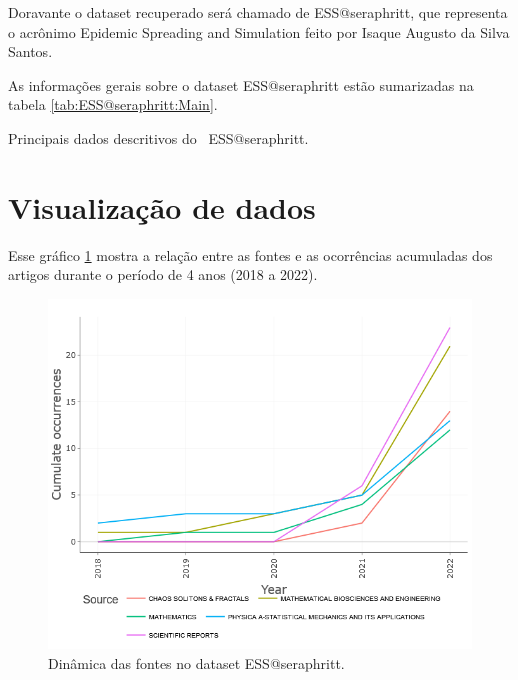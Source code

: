 Doravante o dataset recuperado será chamado de ESS@seraphritt, que representa o acrônimo Epidemic Spreading and Simulation feito por Isaque Augusto da Silva Santos.

As informações gerais sobre o dataset ESS@seraphritt estão sumarizadas na tabela \ref{tab:ESS@seraphritt:Main}.

\begin{table}[htp]
\centering
{}
    \caption{Principais dados descritivos do \dataset\ ESS@seraphritt.}
    \label{tab:ESS@seraphritt:Main}
\end{table}

\section{Visualização de dados}

Esse gráfico \ref{ESS@seraphritt-cumulate} mostra a relação entre as fontes e as ocorrências acumuladas dos artigos durante o período de 4 anos (2018 a 2022).

\begin{figure}
    \centering
    \includegraphics[width=\textwidth]{exploratory-data-analysis/seraphritt/PesqBibliogr/Virus-Network/souce_dynamics.png}
    \caption{Dinâmica das fontes no dataset ESS@seraphritt.}
    \label{ESS@seraphritt-cumulate}
\end{figure}

